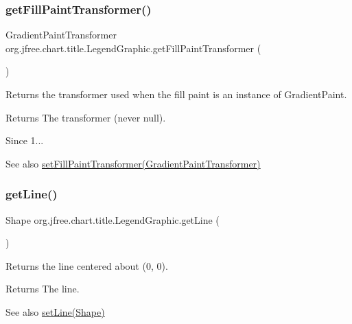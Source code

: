 \subsubsection{\texorpdfstring{get\+Fill\+Paint\+Transformer()}{getFillPaintTransformer()}}
{\footnotesize\ttfamily Gradient\+Paint\+Transformer org.\+jfree.\+chart.\+title.\+Legend\+Graphic.\+get\+Fill\+Paint\+Transformer (\begin{DoxyParamCaption}{ }\end{DoxyParamCaption})}

Returns the transformer used when the fill paint is an instance of {\ttfamily Gradient\+Paint}.

\begin{DoxyReturn}{Returns}
The transformer (never {\ttfamily null}).
\end{DoxyReturn}
\begin{DoxySince}{Since}
1...
\end{DoxySince}
\begin{DoxySeeAlso}{See also}
\mbox{\hyperlink{classorg_1_1jfree_1_1chart_1_1title_1_1_legend_graphic_ae89deacb22526a33371d0b781ac13a62}{set\+Fill\+Paint\+Transformer(\+Gradient\+Paint\+Transformer)}} 
\end{DoxySeeAlso}
\mbox{\label{classorg_1_1jfree_1_1chart_1_1title_1_1_legend_graphic_a29368c04acca49c9e247a41359583b16}} 
\subsubsection{\texorpdfstring{get\+Line()}{getLine()}}
{\footnotesize\ttfamily Shape org.\+jfree.\+chart.\+title.\+Legend\+Graphic.\+get\+Line (\begin{DoxyParamCaption}{ }\end{DoxyParamCaption})}

Returns the line centered about (0, 0).

\begin{DoxyReturn}{Returns}
The line.
\end{DoxyReturn}
\begin{DoxySeeAlso}{See also}
\mbox{\hyperlink{classorg_1_1jfree_1_1chart_1_1title_1_1_legend_graphic_a9b43b803b92c87a92717ce4fd1c6c484}{set\+Line(\+Shape)}} 
\end{DoxySeeAlso}
\mbox{\label{classorg_1_1jfree_1_1chart_1_1title_1_1_legend_graphic_a6b401a8f825fcf68b9e3ac3eeb5669ef}} 
